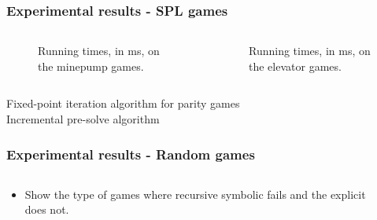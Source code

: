 \documentclass[handout,aspectratio=169]{beamer}
\begin{document}
\begin{frame}[t]
\frametitle{Experimental results - SPL games}
\def\scalegraphs{0.6}
\begin{columns}[t]
	\begin{column}{0.5\textwidth}
		\begin{figure}[H]
			
			\caption{Running times, in ms, on the minepump games.}
			\label{fig:results_minepump}
		\end{figure}%
	\end{column}
	\begin{column}{0.5\textwidth}
		\begin{figure}[H]
			
			\caption{Running times, in ms, on the elevator games.}
			\label{fig:results_elevator}
		\end{figure}%
	\end{column}
\end{columns}
\small
{} Fixed-point iteration algorithm for parity games\\
 Incremental pre-solve algorithm\\
\end{frame}


\begin{frame}[t]
\frametitle{Experimental results - Random games}
\begin{columns}[t]
	\begin{column}{0.5\textwidth}
		\begin{itemize}
			\item Show the type of games where recursive symbolic fails and the explicit does not.
		\end{itemize}
	\end{column}
	\begin{column}{0.5\textwidth}
	\end{column}
\end{columns}
\end{frame}
\end{document}
